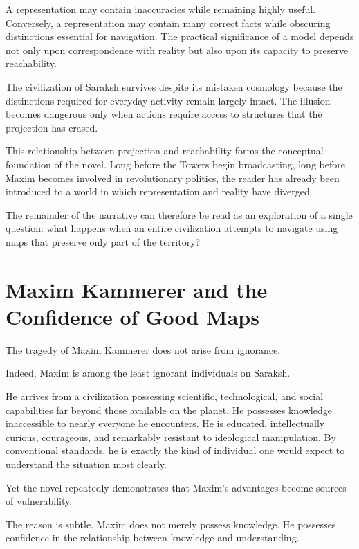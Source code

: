 \documentclass[12pt, a4paper]{article}
\theoremstyle{plain}
\theoremstyle{definition}
\theoremstyle{remark}
\begin{document}
A representation may contain inaccuracies while
remaining highly useful. Conversely, a
representation may contain many correct facts
while obscuring distinctions essential for
navigation. The practical significance of a model
depends not only upon correspondence with reality
but also upon its capacity to preserve reachability.

The civilization of Saraksh survives despite its
mistaken cosmology because the distinctions
required for everyday activity remain largely
intact. The illusion becomes dangerous only when
actions require access to structures that the
projection has erased.

This relationship between projection and
reachability forms the conceptual foundation
of the novel. Long before the Towers begin
broadcasting, long before Maxim becomes involved
in revolutionary politics, the reader has already
been introduced to a world in which representation
and reality have diverged.

The remainder of the narrative can therefore be
read as an exploration of a single question:
what happens when an entire civilization attempts
to navigate using maps that preserve only part
of the territory?

\section{Maxim Kammerer and the Confidence of Good Maps}

The tragedy of Maxim Kammerer does not arise
from ignorance.

Indeed, Maxim is among the least ignorant
individuals on Saraksh.

He arrives from a civilization possessing
scientific, technological, and social capabilities
far beyond those available on the planet. He
possesses knowledge inaccessible to nearly everyone
he encounters. He is educated, intellectually
curious, courageous, and remarkably resistant to
ideological manipulation. By conventional standards,
he is exactly the kind of individual one would
expect to understand the situation most clearly.

Yet the novel repeatedly demonstrates that Maxim's
advantages become sources of vulnerability.

The reason is subtle. Maxim does not merely possess
knowledge. He possesses confidence in the
relationship between knowledge and understanding.
\end{document}
